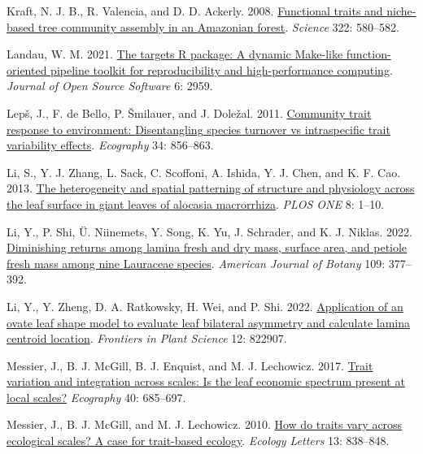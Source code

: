 \documentclass[
  12pt,
  a4paper,
,tablecaptionabove
]{scrartcl}
\newlength{\cslhangindent}
\newenvironment{CSLReferences}[2] %
 {%
  \setlength{\parindent}{0pt}
  \ifodd #1 \everypar{\setlength{\hangindent}{\cslhangindent}}\ignorespaces\fi
  \ifnum #2 > 0
  \setlength{\parskip}{#2\baselineskip}
  \fi
 }%
 {}
\begin{document}
\begin{CSLReferences}{1}{0}
\leavevmode{}%
Kraft, N. J. B., R. Valencia, and D. D. Ackerly. 2008. \href{https://doi.org/10.1126/science.1160662}{Functional traits and niche-based tree community assembly in an {Amazonian} forest}. \emph{Science} 322: 580--582.

\leavevmode{}%
Landau, W. M. 2021. \href{https://doi.org/10.21105/joss.02959}{The targets {R} package: A dynamic {Make-like} function-oriented pipeline toolkit for reproducibility and high-performance computing}. \emph{Journal of Open Source Software} 6: 2959.

\leavevmode{}%
Lepš, J., F. de Bello, P. Šmilauer, and J. Doležal. 2011. \href{https://doi.org/10.1111/j.1600-0587.2010.06904.x}{Community trait response to environment: {Disentangling} species turnover vs intraspecific trait variability effects}. \emph{Ecography} 34: 856--863.

\leavevmode{}%
Li, S., Y. J. Zhang, L. Sack, C. Scoffoni, A. Ishida, Y. J. Chen, and K. F. Cao. 2013. \href{https://doi.org/10.1371/journal.pone.0066016}{The heterogeneity and spatial patterning of structure and physiology across the leaf surface in giant leaves of alocasia macrorrhiza}. \emph{PLOS ONE} 8: 1--10.

\leavevmode{}%
Li, Y., P. Shi, Ü. Niinemets, Y. Song, K. Yu, J. Schrader, and K. J. Niklas. 2022. \href{https://doi.org/10.1002/ajb2.1812}{Diminishing returns among lamina fresh and dry mass, surface area, and petiole fresh mass among nine {Lauraceae} species}. \emph{American Journal of Botany} 109: 377--392.

\leavevmode{}%
Li, Y., Y. Zheng, D. A. Ratkowsky, H. Wei, and P. Shi. 2022. \href{https://doi.org/10.3389/fpls.2021.822907}{Application of an ovate leaf shape model to evaluate leaf bilateral asymmetry and calculate lamina centroid location}. \emph{Frontiers in Plant Science} 12: 822907.

\leavevmode{}%
Messier, J., B. J. McGill, B. J. Enquist, and M. J. Lechowicz. 2017. \href{https://doi.org/10.1111/ecog.02006}{Trait variation and integration across scales: Is the leaf economic spectrum present at local scales?} \emph{Ecography} 40: 685--697.

\leavevmode{}%
Messier, J., B. J. McGill, and M. J. Lechowicz. 2010. \href{https://doi.org/10.1111/j.1461-0248.2010.01476.x}{How do traits vary across ecological scales? {A} case for trait-based ecology}. \emph{Ecology Letters} 13: 838--848.


\end{CSLReferences}
\end{document}
